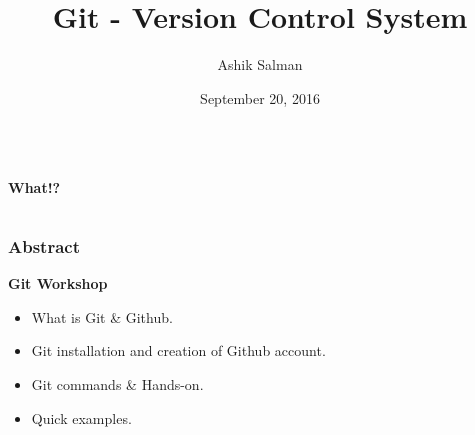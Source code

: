 \documentclass[10pt]{beamer}
\title{Git - Version Control System}
\author{Ashik Salman}
\institute[UMBC]{Beginner Workshop \\
  ..... \\
  Backend Developer \\
  Chillr, Backwater Technologies \\
  Kochi, Kerala \\

}
\date{September 20, 2016}
\begin{document}

\begin{frame}[plain]
  \titlepage
\end{frame}
	
\begin{frame}
  \begin{columns}
    \begin{column}{0.1\textwidth}
      \textbf{What!?}
    \end{column}
  \end{columns}
\end{frame}

\begin{frame}
  \frametitle{Abstract}
  \textbf{Git Workshop}
  \medskip
  \begin{itemize}
    \item What is Git \& Github.
    \item Git installation and creation of Github account.
    \item Git commands \& Hands-on.
    \item Quick examples.
  \end{itemize}
\end{frame}
\end{document}
